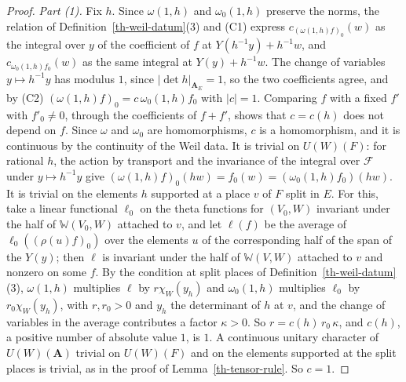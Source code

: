 \begin{proof}
\emph{Part (1).} Fix $h$. Since $\omega(1,h)$ and $\omega_0(1,h)$ preserve the
norms, the relation of Definition~\ref{th-weil-datum}(3) and (C1) express
$c_{(\omega(1,h)f)_0}(w)$ as the integral over $y$ of the coefficient of $f$ at
$Y(h^{-1}y)+h^{-1}w$, and $c_{\omega_0(1,h)f_0}(w)$ as the same integral at
$Y(y)+h^{-1}w$. The change of variables $y\mapsto h^{-1}y$ has modulus $1$,
since $|\det h|_{\mathbf A_E}=1$, so the two coefficients agree, and by (C2)
$(\omega(1,h)f)_0=c\,\omega_0(1,h)f_0$ with $|c|=1$. Comparing $f$ with a fixed
$f'$ with $f'_0\neq0$, through the coefficients of $f+f'$, shows that
$c=c(h)$ does not depend on $f$. Since $\omega$ and $\omega_0$ are
homomorphisms, $c$ is a homomorphism, and it is continuous by the continuity
of the Weil data. It is trivial on $U(W)(F)$: for rational $h$, the action by
transport and the invariance of the integral over $\mathcal F$ under
$y\mapsto h^{-1}y$ give $(\omega(1,h)f)_0(hw)=f_0(w)=(\omega_0(1,h)f_0)(hw)$.
It is trivial on the elements $h$ supported at a place $v$ of $F$ split in $E$.
For this, take a linear functional $\ell_0$ on the theta functions for
$(V_0,W)$ invariant under the half of $\mathbb W(V_0,W)$ attached to $v$, and
let $\ell(f)$ be the average of $\ell_0((\rho(u)f)_0)$ over the elements $u$ of
the corresponding half of the span of the $Y(y)$; then $\ell$ is invariant
under the half of $\mathbb W(V,W)$ attached to $v$ and nonzero on some $f$. By
the condition at split places of Definition~\ref{th-weil-datum}(3), $\omega(1,h)$
multiplies $\ell$ by $r\chi_W(y_h)$ and $\omega_0(1,h)$ multiplies $\ell_0$ by
$r_0\chi_W(y_h)$, with $r,r_0>0$ and $y_h$ the determinant of $h$ at $v$, and
the change of variables in the average contributes a factor $\kappa>0$. So
$r=c(h)\,r_0\,\kappa$, and $c(h)$, a positive number of absolute value $1$, is
$1$. A continuous unitary character of $U(W)(\mathbf A)$ trivial on $U(W)(F)$
and on the elements supported at the split places is trivial, as in the proof
of Lemma~\ref{th-tensor-rule}. So $c=1$.


\end{proof}
